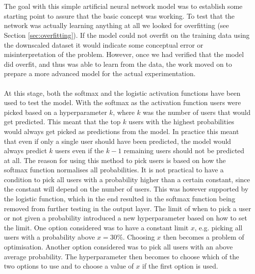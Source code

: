 \\\\
The goal with this simple artificial neural network model was to establish some starting point to assure that the basic concept was working. To test that the network was actually learning anything at all we looked for overfitting (see Section \ref{sec:overfitting}). If the model could not overfit on the training data using the downscaled dataset it would indicate some conceptual error or misinterpretation of the problem. However, once we had verified that the model did overfit, and thus was able to learn from the data, the work moved on to prepare a more advanced model for the actual experimentation.
\\\\
At this stage, both the softmax and the logistic activation functions have been used to test the model. With the softmax as the activation function users were picked based on a hyperparameter $k$, where $k$ was the number of users that would get predicted. This meant that the top $k$ users with the highest probabilities would always get picked as predictions from the model. In practice this meant that even if only a single user should have been predicted, the model would always predict $k$ users even if the $k-1$ remaining users should not be predicted at all. The reason for using this method to pick users is based on how the softmax function normalises all probabilities. It is not practical to have a condition to pick all users with a probability higher than a certain constant, since the constant will depend on the number of users. This was however supported by the logistic function, which in the end resulted in the softmax function being removed from further testing in the output layer. The limit of when to pick a user or not given a probability introduced a new hyperparameter based on how to set the limit. One option considered was to have a constant limit $x$, e.g. picking all users with a probability above $x=30\%$. Choosing $x$ then becomes a problem of optimisation. Another option considered was to pick all users with an above average probability. The hyperparameter then becomes to choose which of the two options to use and to choose a value of $x$ if the first option is used.
\\\\
